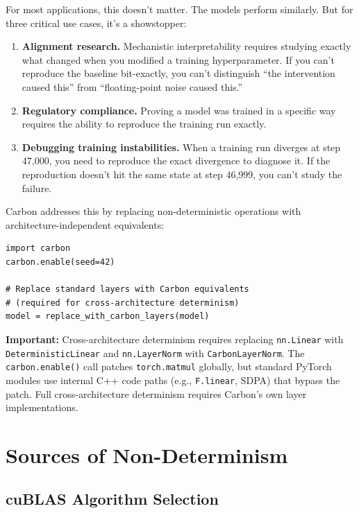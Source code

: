 \documentclass[11pt,a4paper]{article}
\begin{document}
For most applications, this doesn't matter. The models perform similarly.
But for three critical use cases, it's a showstopper:

\begin{enumerate}
  \item \textbf{Alignment research.} Mechanistic interpretability requires
    studying exactly what changed when you modified a training hyperparameter.
    If you can't reproduce the baseline bit-exactly, you can't distinguish
    ``the intervention caused this'' from ``floating-point noise caused this.''
  \item \textbf{Regulatory compliance.} Proving a model was trained in a specific
    way requires the ability to reproduce the training run exactly.
  \item \textbf{Debugging training instabilities.} When a training run diverges
    at step 47,000, you need to reproduce the exact divergence to diagnose it.
    If the reproduction doesn't hit the same state at step 46,999, you can't
    study the failure.
\end{enumerate}

Carbon addresses this by replacing non-deterministic operations with
architecture-independent equivalents:

\begin{lstlisting}
import carbon
carbon.enable(seed=42)

# Replace standard layers with Carbon equivalents
# (required for cross-architecture determinism)
model = replace_with_carbon_layers(model)
\end{lstlisting}

\textbf{Important:} Cross-architecture determinism requires replacing
\texttt{nn.Linear} with \texttt{DeterministicLinear} and
\texttt{nn.LayerNorm} with \texttt{CarbonLayerNorm}. The
\texttt{carbon.enable()} call patches \texttt{torch.matmul} globally,
but standard PyTorch modules use internal C++ code paths (e.g.,
\texttt{F.linear}, SDPA) that bypass the patch. Full cross-architecture
determinism requires Carbon's own layer implementations.

\section{Sources of Non-Determinism}

\subsection{cuBLAS Algorithm Selection}
\end{document}
